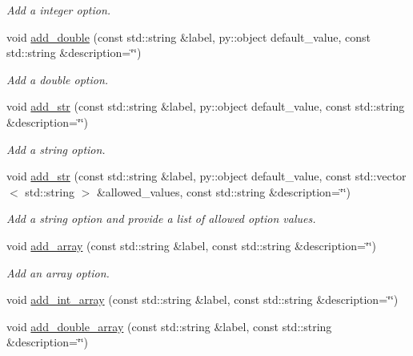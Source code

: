 \begin{DoxyCompactItemize}
\begin{DoxyCompactList}\small\item\em Add a integer option. \end{DoxyCompactList}\item 
void \mbox{\hyperlink{classforte_1_1_forte_options_a02b721aef2f89ac6bee8827b8c093ab9}{add\+\_\+double}} (const std\+::string \&label, py\+::object default\+\_\+value, const std\+::string \&description=\char`\"{}\char`\"{})
\begin{DoxyCompactList}\small\item\em Add a double option. \end{DoxyCompactList}\item 
void \mbox{\hyperlink{classforte_1_1_forte_options_a516c1ed4379461d33fe2ce89c8ee319a}{add\+\_\+str}} (const std\+::string \&label, py\+::object default\+\_\+value, const std\+::string \&description=\char`\"{}\char`\"{})
\begin{DoxyCompactList}\small\item\em Add a string option. \end{DoxyCompactList}\item 
void \mbox{\hyperlink{classforte_1_1_forte_options_ad5a9b605229b95b67113af8875e11ca6}{add\+\_\+str}} (const std\+::string \&label, py\+::object default\+\_\+value, const std\+::vector$<$ std\+::string $>$ \&allowed\+\_\+values, const std\+::string \&description=\char`\"{}\char`\"{})
\begin{DoxyCompactList}\small\item\em Add a string option and provide a list of allowed option values. \end{DoxyCompactList}\item 
void \mbox{\hyperlink{classforte_1_1_forte_options_aa00fd802399c85b9e9f94744c5fda551}{add\+\_\+array}} (const std\+::string \&label, const std\+::string \&description=\char`\"{}\char`\"{})
\begin{DoxyCompactList}\small\item\em Add an array option. \end{DoxyCompactList}\item 
void \mbox{\hyperlink{classforte_1_1_forte_options_af8b0cea9c4dd2c2d072417b02321c974}{add\+\_\+int\+\_\+array}} (const std\+::string \&label, const std\+::string \&description=\char`\"{}\char`\"{})
\item 
void \mbox{\hyperlink{classforte_1_1_forte_options_a3be674c56cd6efec24f1ca5fa1ccd02d}{add\+\_\+double\+\_\+array}} (const std\+::string \&label, const std\+::string \&description=\char`\"{}\char`\"{})

\end{DoxyCompactItemize}

